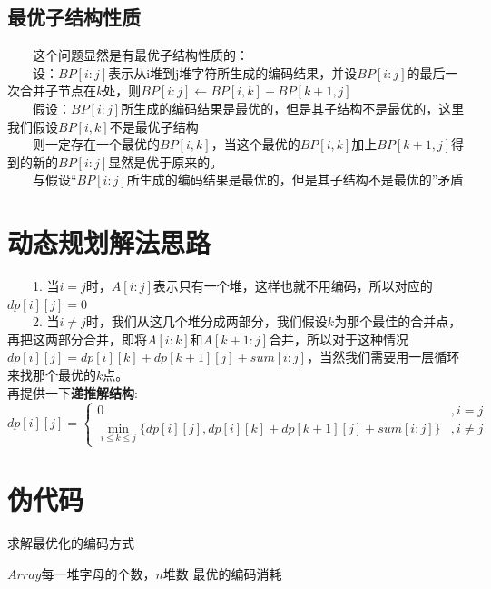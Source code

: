 \documentclass[11pt]{ctexart}
\begin{document}
\subsection{最优子结构性质}
\noindent　　这个问题显然是有最优子结构性质的：\\
　　设：$BP[i:j]$表示从i堆到j堆字符所生成的编码结果，并设$BP[i:j]$的最后一次合并子节点在$k$处，则$BP[i:j] \gets BP[i,k] + BP[k+1,j]$\\
　　假设：$BP[i:j]$所生成的编码结果是最优的，但是其子结构不是最优的，这里我们假设$BP[i,k]$不是最优子结构\\
　　则一定存在一个最优的$BP[i,k]$，当这个最优的$BP[i,k]$加上$BP[k+1,j]$得到的新的$BP[i:j]$显然是优于原来的。\\
　　与假设“$BP[i:j]$所生成的编码结果是最优的，但是其子结构不是最优的”矛盾\\
\section{动态规划解法思路}
\noindent　　1. 当$i=j$时，$A[i:j]$表示只有一个堆，这样也就不用编码，所以对应的$dp[i][j]=0$\\
　　2. 当$i \neq j$时，我们从这几个堆分成两部分，我们假设$k$为那个最佳的合并点，再把这两部分合并，即将$A[i:k]$和$A[k+1:j]$合并，所以对于这种情况$dp[i][j]=dp[i][k]+dp[k+1][j]+sum[i:j]$，当然我们需要用一层循环来找那个最优的$k$点。\\
再提供一下\textbf{递推解结构}:
\begin{equation}
dp[i][j] = \left\{
\begin{array}{cc}
0& ,i=j\\
\min\limits_{i \leqslant k \leqslant j}\{dp[i][j], dp[i][k]+dp[k+1][j]+sum[i:j]\}& ,i \neq j
\end{array}
\right.
\end{equation}

\section{伪代码}
\begin{algorithm}[H]
\caption{求解最优化的编码方式}
\begin{algorithmic}[1] %
\Require $Array$每一堆字母的个数，$n$堆数
\Ensure 最优的编码消耗
\EndFor
\EndFor
\EndFor
\State {}
\EndFunction
\end{algorithmic}
\end{algorithm}
\end{document}
